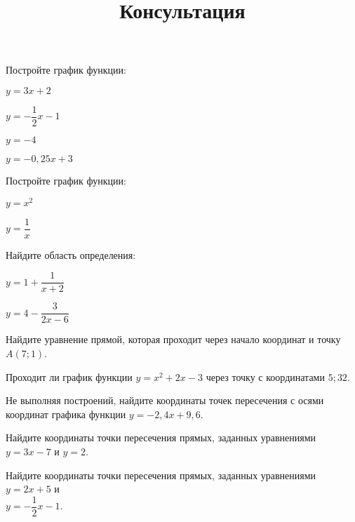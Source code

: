 \newpage
\title{Консультация}
\begin{listofex}
	\item Постройте график функции:
	\begin{enumcols}[itemcolumns=2]
		\item \( y=3x+2 \)
		\item \( y=-\dfrac{1}{2}x-1 \)
		\item \( y=-4 \)
		\item \( y=-0,25x+3 \)
	\end{enumcols}
	\item Постройте график функции:
	\begin{enumcols}[itemcolumns=2]
		\item \( y=x^2 \)
		\item \( y=\dfrac{1}{x} \)
	\end{enumcols}
	\item Найдите область определения:
	\begin{enumcols}[itemcolumns=2]
		\item \( y=1+\dfrac{1}{x+2} \)
		\item \( y=4-\dfrac{3}{2x-6} \)
	\end{enumcols}
	\item Найдите уравнение прямой, которая проходит через начало координат и точку \( A(7;1) \).
	\item Проходит ли график функции \( y=x^2+2x-3 \) через точку с координатами \( 5;32 \).
	\item Не выполняя построений, найдите координаты точек пересечения с осями координат графика функции \( y=-2,4x+9,6 \).
	\item Найдите координаты точки пересечения прямых, заданных уравнениями \( y=3x-7 \) и \( y=2 \).
	\item Найдите координаты точки пересечения прямых, заданных уравнениями \( y=2x+5 \) и\\ \( y=-\dfrac{1}{2}x-1 \).
\end{listofex}